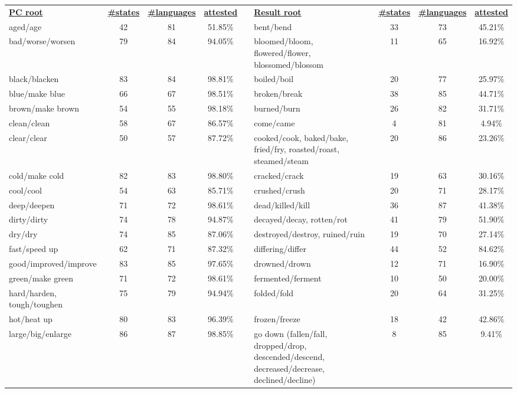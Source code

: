 \begin{tabular}{p{3cm}ccccp{3cm}ccc}
\underline{\textbf{PC root}} & \underline{\textbf{\#states}} & \underline{\textbf{\#languages}} & \underline{\textbf{attested}} & & \underline{\textbf{Result root}} & \underline{\textbf{\#states}} & \underline{\textbf{\#languages}} & \underline{\textbf{attested}} \\
aged/age & 42 & 81 & 51.85\% & & bent/bend & 33 & 73 & 45.21\% \\
bad/worse/worsen & 79 & 84 & 94.05\% & & bloomed/bloom, flowered/flower, blossomed/blossom & 11 & 65 & 16.92\% \\
black/blacken & 83 & 84 & 98.81\% & & boiled/boil & 20 & 77 & 25.97\% \\
blue/make blue & 66 & 67 & 98.51\% & & broken/break & 38 & 85 & 44.71\% \\
brown/make brown & 54 & 55 & 98.18\% & & burned/burn & 26 & 82 & 31.71\% \\
clean/clean & 58 & 67 & 86.57\% & & come/came & 4 & 81 & 4.94\% \\
clear/clear & 50 & 57 & 87.72\% & & cooked/cook, baked/bake, fried/fry, roasted/roast, steamed/steam & 20 & 86 & 23.26\% \\
cold/make cold & 82 & 83 & 98.80\% & & cracked/crack & 19 & 63 & 30.16\% \\
cool/cool & 54 & 63 & 85.71\% & & crushed/crush & 20 & 71 & 28.17\% \\
deep/deepen & 71 & 72 & 98.61\% & & dead/killed/kill & 36 & 87 & 41.38\% \\
dirty/dirty & 74 & 78 & 94.87\% & & decayed/decay, rotten/rot & 41 & 79 & 51.90\% \\
dry/dry & 74 & 85 & 87.06\% & & destroyed/destroy, ruined/ruin & 19 & 70 & 27.14\% \\
fast/speed up & 62 & 71 & 87.32\% & & differing/differ & 44 & 52 & 84.62\% \\
good/improved/improve & 83 & 85 & 97.65\% & & drowned/drown & 12 & 71 & 16.90\% \\
green/make green & 71 & 72 & 98.61\% & & fermented/ferment & 10 & 50 & 20.00\% \\
hard/harden, tough/toughen & 75 & 79 & 94.94\% & & folded/fold & 20 & 64 & 31.25\% \\
hot/heat up & 80 & 83 & 96.39\% & & frozen/freeze & 18 & 42 & 42.86\% \\
large/big/enlarge & 86 & 87 & 98.85\% & & go down (fallen/fall, dropped/drop, descended/descend, decreased/decrease, declined/decline) & 8 & 85 & 9.41\% \\

\end{tabular}
